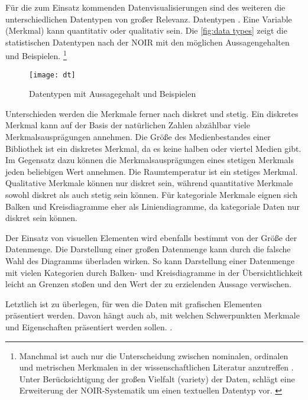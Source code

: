Für die zum Einsatz kommenden Datenvisualisierungen sind des weiteren die unterschiedlichen Datentypen von großer Relevanz.
Datentypen  \cite[99]{kirk_data_2019}.  Eine Variable (Merkmal) kann quantitativ oder qualitativ sein.
Die \autoref{fig:data types} zeigt die statistischen Datentypen nach der \acrfull{NOIR} 
\cite[Vgl.][12 ff.]{bortz_statistik_2010} mit den möglichen Aussagengehalten und Beispielen.
\footnote{Manchmal ist auch nur die Unterscheidung zwischen nominalen, ordinalen und metrischen
Merkmalen in der wissenschaftlichen Literatur anzutreffen \cite[Vgl.][20]{cleff_deskriptive_2011}. 
Unter Berücksichtigung der großen Vielfalt (variety) der Daten, schlägt  
eine Erweiterung der \acrshort{NOIR}-Systematik um einen textuellen Datentyp vor. \cite[Vgl.][100]{kirk_data_2019}}

 
 \begin{figure}[h]
    \centering
        \texttt{[image: dt]}
        \caption{Datentypen mit Aussagegehalt und Beispielen}
        \label{fig:data types}
\end{figure}


Unterschieden werden die Merkmale ferner nach diskret und stetig.
Ein diskretes Merkmal kann auf der Basis der natürlichen Zahlen abzählbar viele Merkmalsausprägungen annehmen.
Die Größe des Medienbestandes einer Bibliothek ist ein diskretes Merkmal, da es keine halben oder viertel Medien gibt.
Im Gegensatz dazu können die Merkmalsausprägungen eines stetigen Merkmals jeden beliebigen Wert annehmen. Die Raumtemperatur ist ein stetiges Merkmal.
Qualitative Merkmale können nur diskret sein, während quantitative Merkmale sowohl diskret als auch stetig sein können. 
Für kategoriale Merkmale eignen sich Balken und Kreisdiagramme eher als Liniendiagramme, da kategoriale Daten nur diskret sein können.

Der Einsatz von visuellen Elementen wird ebenfalls bestimmt von der Größe der Datenmenge.
Die Darstellung einer großen Datenmenge kann durch die falsche Wahl des Diagramms überladen wirken. 
So kann Darstellung einer Datenmenge mit vielen Kategorien durch Balken- und Kreisdiagramme 
in der Übersichtlichkeit leicht an Grenzen stoßen und den Wert der zu erzielenden Aussage verwischen.

Letztlich ist zu überlegen, für wen die Daten mit grafischen Elementen präsentiert werden. Davon hängt auch ab, 
mit welchen Schwerpunkten Merkmale und Eigenschaften präsentiert werden sollen.
\cite[Vgl.][17]{kirk_data_2019}. 

